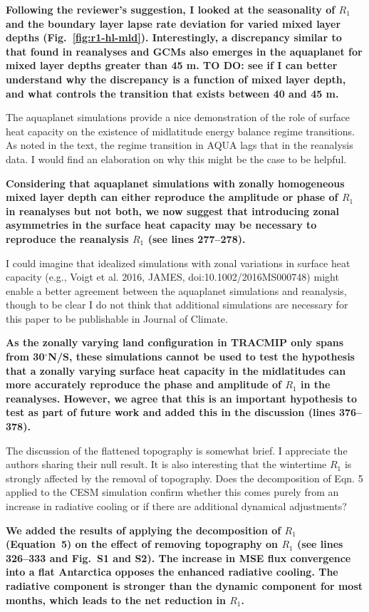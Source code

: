\documentclass{article}
\begin{document}
{\color{red}\textbf{Following the reviewer's suggestion, I looked at the seasonality of $R_1$ and the boundary layer lapse rate deviation for varied mixed layer depths (Fig.~\ref{fig:r1-hl-mld}). Interestingly, a discrepancy similar to that found in reanalyses and GCMs also emerges in the aquaplanet for mixed layer depths greater than 45 m. TO DO: see if I can better understand why the discrepancy is a function of mixed layer depth, and what controls the transition that exists between 40 and 45 m.}}

The aquaplanet simulations provide a nice demonstration of the role of surface heat capacity on the existence of midlatitude energy balance regime transitions. As noted in the text, the regime transition in AQUA lags that in the reanalysis data. I would find an elaboration on why this might be the case to be helpful.

\textbf{Considering that aquaplanet simulations with zonally homogeneous mixed layer depth can either reproduce the amplitude or phase of $R_1$ in reanalyses but not both, we now suggest that introducing zonal asymmetries in the surface heat capacity may be necessary to reproduce the reanalysis $R_1$ (see lines 277--278).}

I could imagine that idealized simulations with zonal variations in surface heat capacity (e.g., Voigt et al. 2016, JAMES, doi:10.1002/2016MS000748) might enable a better agreement between the aquaplanet simulations and reanalysis, though to be clear I do not think that additional simulations are necessary for this paper to be publishable in Journal of Climate.

\textbf{As the zonally varying land configuration in TRACMIP only spans from 30$^\circ$N/S, these simulations cannot be used to test the hypothesis that a zonally varying surface heat capacity in the midlatitudes can more accurately reproduce the phase and amplitude of $R_1$ in the reanalyses. However, we agree that this is an important hypothesis to test as part of future work and added this in the discussion (lines 376--378).}

The discussion of the flattened topography is somewhat brief. I appreciate the authors sharing their null result. It is also interesting that the wintertime $R_1$ is strongly affected by the removal of topography. Does the decomposition of Eqn. 5 applied to the CESM simulation confirm whether this comes purely from an increase in radiative cooling or if there are additional dynamical adjustments?

\textbf{We added the results of applying the decomposition of $R_1$ (Equation~5) on the effect of removing topography on $R_1$ (see lines 326--333 and Fig.~S1 and S2). The increase in MSE flux convergence into a flat Antarctica opposes the enhanced radiative cooling. The radiative component is stronger than the dynamic component for most months, which leads to the net reduction in $R_1$.}
\end{document}
